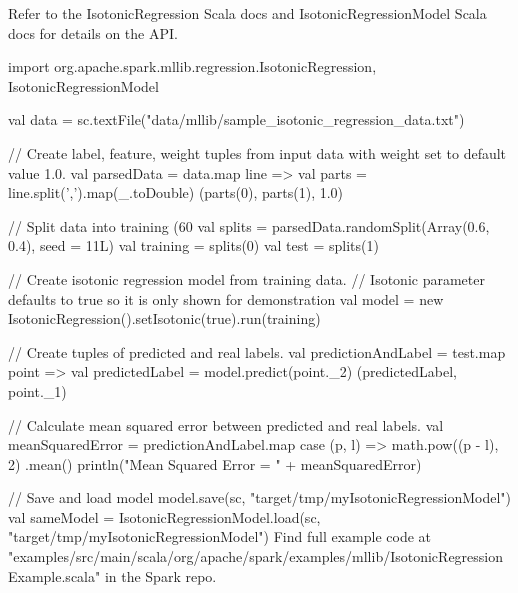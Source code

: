 Refer to the IsotonicRegression Scala docs and IsotonicRegressionModel Scala docs for details on the API.

import org.apache.spark.mllib.regression.{IsotonicRegression, IsotonicRegressionModel}

val data = sc.textFile("data/mllib/sample_isotonic_regression_data.txt")

// Create label, feature, weight tuples from input data with weight set to default value 1.0.
val parsedData = data.map { line =>
  val parts = line.split(',').map(_.toDouble)
  (parts(0), parts(1), 1.0)
}

// Split data into training (60%
val splits = parsedData.randomSplit(Array(0.6, 0.4), seed = 11L)
val training = splits(0)
val test = splits(1)

// Create isotonic regression model from training data.
// Isotonic parameter defaults to true so it is only shown for demonstration
val model = new IsotonicRegression().setIsotonic(true).run(training)

// Create tuples of predicted and real labels.
val predictionAndLabel = test.map { point =>
  val predictedLabel = model.predict(point._2)
  (predictedLabel, point._1)
}

// Calculate mean squared error between predicted and real labels.
val meanSquaredError = predictionAndLabel.map { case (p, l) => math.pow((p - l), 2) }.mean()
println("Mean Squared Error = " + meanSquaredError)

// Save and load model
model.save(sc, "target/tmp/myIsotonicRegressionModel")
val sameModel = IsotonicRegressionModel.load(sc, "target/tmp/myIsotonicRegressionModel")
Find full example code at "examples/src/main/scala/org/apache/spark/examples/mllib/IsotonicRegressionExample.scala" in the Spark repo.

